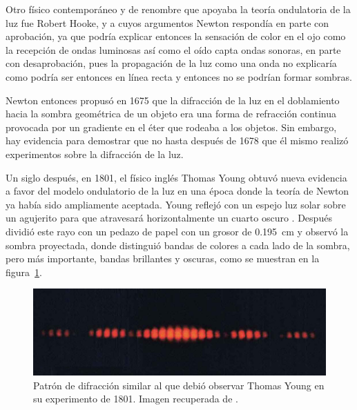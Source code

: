 Otro físico contemporáneo y de renombre que apoyaba la teoría ondulatoria de la luz fue Robert Hooke, y a cuyos argumentos Newton respondía en parte con aprobación, ya que podría explicar entonces la sensación de color en el ojo como la recepción de ondas luminosas así como el oído capta ondas sonoras, en parte con desaprobación, pues la propagación de la luz como una onda no explicaría como podría ser entonces en línea recta y entonces no se podrían formar sombras.

Newton entonces propusó en 1675 que la difracción de la luz en el doblamiento hacia la sombra geométrica de un objeto era una forma de refracción continua provocada por un gradiente en el éter que rodeaba a los objetos.  Sin embargo, hay evidencia para demostrar que no hasta después de 1678 que él mismo realizó experimentos sobre la difracción de la luz.

Un siglo después, en 1801, el físico inglés Thomas Young obtuvó nueva evidencia a favor del modelo ondulatorio de la luz en una época donde la teoría de Newton ya había sido ampliamente aceptada. Young reflejó con un espejo luz solar sobre un agujerito para que atravesará horizontalmente un cuarto oscuro \parencite{Young-1804}.  Después dividió este rayo con un pedazo de papel con un grosor de \qty{.195}{\cm} y observó la sombra proyectada, donde distinguió bandas de colores a cada lado de la sombra, pero más importante, bandas brillantes y oscuras, como se muestran en la figura~\ref{fig: double_slit}.

\begin{figure}[H]
	\centering
	\includegraphics[width=.7\linewidth]{Imagenes/diffraction}
	\caption{Patrón de difracción similar al que debió observar Thomas Young en su experimento de 1801. Imagen recuperada de \parencite{openstax}.}
	\label{fig: double_slit}
\end{figure}